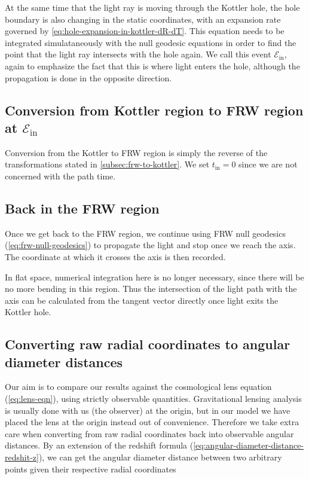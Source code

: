 At the same time that the light ray is moving through the Kottler hole, the hole boundary is also changing in the static coordinates, with an expansion rate governed by \autoref{eq:hole-expansion-in-kottler-dR-dT}. This equation needs to be integrated simulataneously with the null geodesic equations in order to find the point that the light ray intersects with the hole again. We call this event $\mathcal{E}_{\text{in}}$, again to emphasize the fact that this is where light enters the hole, although the propagation is done in the opposite direction. 

\subsection{Conversion from Kottler region to FRW region at $\mathcal{E}_{\text{in}}$}

Conversion from the Kottler to FRW region is simply the reverse of the transformations stated in \autoref{subsec:frw-to-kottler}. We set $t_{\text{in}} = 0$ since we are not concerned with the path time. 

\subsection{Back in the FRW region}

Once we get back to the FRW region, we continue using FRW null geodesics (\autoref{eq:frw-null-geodesics}) to propagate the light and stop once we reach the axis. The coordinate at which it crosses the axis is then recorded. 

In flat space, numerical integration here is no longer necessary, since there will be no more bending in this region. Thus the intersection of the light path with the axis can be calculated from the tangent vector directly once light exits the Kottler hole. 

\subsection{Converting raw radial coordinates to angular diameter distances}

Our aim is to compare our results against the cosmological lens equation (\autoref{eq:lens-eqn}), using strictly observable quantities. Gravitational lensing analysis is usually done with us (the observer) at the origin, but in our model we have placed the lens at the origin instead out of convenience. Therefore we take extra care when converting from raw radial coordinates back into observable angular distances. By an extension of the redshift formula (\autoref{eq:angular-diameter-distance-redshit-z}), we can get the angular diameter distance between two arbitrary points given their respective radial coordinates \citep{peacock1999cosmological}


